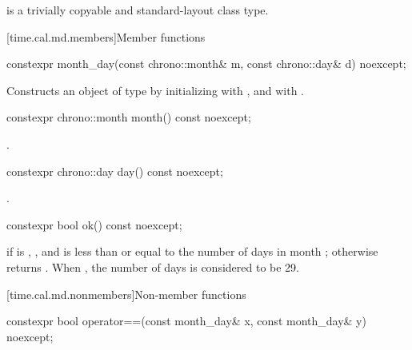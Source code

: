 \pnum
{} is a trivially copyable and standard-layout class type.

[time.cal.md.members]{Member functions}

%
\begin{itemdecl}
constexpr month_day(const chrono::month& m, const chrono::day& d) noexcept;
\end{itemdecl}

\begin{itemdescr}
\pnum
\effects
Constructs an object of type  by
initializing  with , and  with .
\end{itemdescr}

%
\begin{itemdecl}
constexpr chrono::month month() const noexcept;
\end{itemdecl}

\begin{itemdescr}
\pnum
\returns
{}.
\end{itemdescr}

%
\begin{itemdecl}
constexpr chrono::day day() const noexcept;
\end{itemdecl}

\begin{itemdescr}
\pnum
\returns
{}.
\end{itemdescr}

%
\begin{itemdecl}
constexpr bool ok() const noexcept;
\end{itemdecl}

\begin{itemdescr}
\pnum
\returns
{} if
 is ,
, and
 is less than or equal to the number of days in month ;
otherwise returns .
When ,
the number of days is considered to be 29.
\end{itemdescr}

[time.cal.md.nonmembers]{Non-member functions}

%
\begin{itemdecl}
constexpr bool operator==(const month_day& x, const month_day& y) noexcept;
\end{itemdecl}

